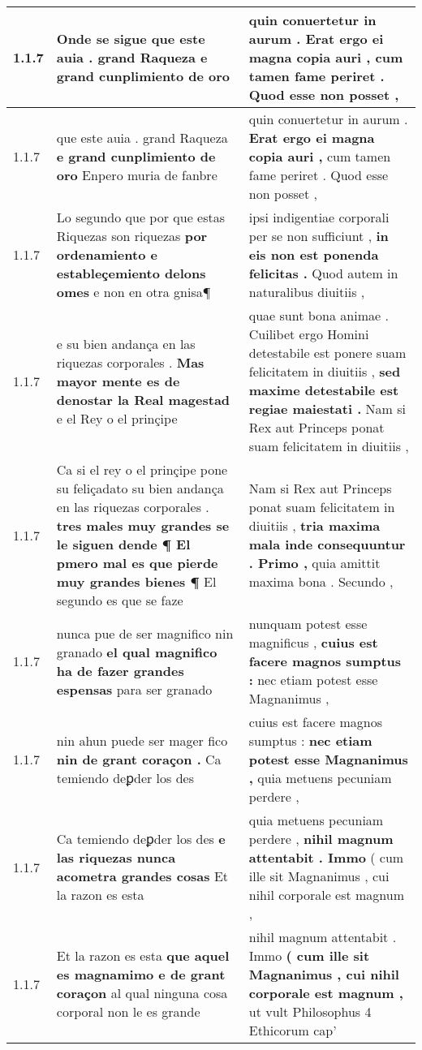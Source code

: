 \begin{tabular}{|p{1cm}|p{6.5cm}|p{6.5cm}|}
1.1.7 & Onde se sigue \textbf{ que este auia . grand Raqueza } e grand cunplimiento de oro & quin conuertetur in aurum . \textbf{ Erat ergo ei magna copia auri , } cum tamen fame periret . Quod esse non posset , \\\hline
1.1.7 & que este auia . grand Raqueza \textbf{ e grand cunplimiento de oro } Enpero muria de fanbre & quin conuertetur in aurum . \textbf{ Erat ergo ei magna copia auri , } cum tamen fame periret . Quod esse non posset , \\\hline
1.1.7 & Lo segundo que por que estas Riquezas son riquezas \textbf{ por ordenamiento e estableçemiento delons omes } e non en otra gnisa¶ & ipsi indigentiae corporali per se non sufficiunt , \textbf{ in eis non est ponenda felicitas . } Quod autem in naturalibus diuitiis , \\\hline
1.1.7 & e su bien andança en las riquezas corporales . \textbf{ Mas mayor mente es de denostar la Real magestad } e el Rey o el prinçipe & quae sunt bona animae . Cuilibet ergo Homini detestabile est ponere suam felicitatem in diuitiis , \textbf{ sed maxime detestabile est regiae maiestati . } Nam si Rex aut Princeps ponat suam felicitatem in diuitiis , \\\hline
1.1.7 & Ca si el rey o el prinçipe pone su feliçadato su bien andança en las riquezas corporales . \textbf{ tres males muy grandes se le siguen dende ¶ El pmero mal es que pierde muy grandes bienes ¶ } El segundo es que se faze & Nam si Rex aut Princeps ponat suam felicitatem in diuitiis , \textbf{ tria maxima mala inde consequuntur . Primo , } quia amittit maxima bona . Secundo , \\\hline
1.1.7 & nunca pue de ser magnifico nin granado \textbf{ el qual magnifico ha de fazer grandes espensas } para ser granado & nunquam potest esse magnificus , \textbf{ cuius est facere magnos sumptus : } nec etiam potest esse Magnanimus , \\\hline
1.1.7 & nin ahun puede ser mager fico \textbf{ nin de grant coraçon . } Ca temiendo deꝑder los des & cuius est facere magnos sumptus : \textbf{ nec etiam potest esse Magnanimus , } quia metuens pecuniam perdere , \\\hline
1.1.7 & Ca temiendo deꝑder los des \textbf{ e las riquezas nunca acometra grandes cosas } Et la razon es esta & quia metuens pecuniam perdere , \textbf{ nihil magnum attentabit . Immo } ( cum ille sit Magnanimus , cui nihil corporale est magnum , \\\hline
1.1.7 & Et la razon es esta \textbf{ que aquel es magnamimo e de grant coraçon } al qual ninguna cosa corporal non le es grande & nihil magnum attentabit . Immo \textbf{ ( cum ille sit Magnanimus , cui nihil corporale est magnum , } ut vult Philosophus 4 Ethicorum cap’ \\\hline

\end{tabular}

